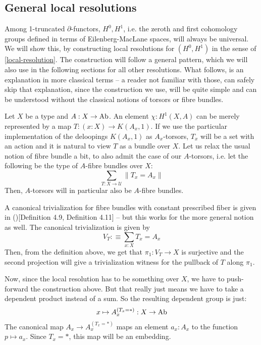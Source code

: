 

\subsection{General local resolutions}


Among 1-truncated $\partial$-functors, $H^0, H^1$, i.e. the zeroth and first cohomology groups defined in terms of Eilenberg-MacLane spaces, will always be universal.
We will show this, by constructing local resolutions for $(H^0,H^1)$ in the sense of \cref{local-resolution}.
The construction will follow a general pattern,
which we will also use in the following sections for all other resolutions.
What follows, is an explanation in more classical terms -- a reader not familiar with those,
can safely skip that explanation, since the construction we use, will be quite simple
and can be understood without the classical notions of torsors or fibre bundles.

Let $X$ be a type and $A:X\to \operatorname{Ab}$.
An element $\chi:H^1(X,A)$ can be merely represented by a map $T:(x:X)\to K(A_x,1)$.
If we use the particular implementation of the deloopings $K(A_x,1)$ as
$A_x$-torsors, $T_x$ will be a set with an action and it is natural to view $T$ as a bundle over $X$.
Let us relax the usual notion of fibre bundle a bit, to also admit the case of our $A$-torsors,
i.e. let the following be the type of $A$-fibre bundles over $X$:
\[ \sum_{T:X\to\mathcal U}\|T_x=A_x\|\]
Then, $A$-torsors will in particular also be $A$-fibre bundles.

A canonical trivialization for fibre bundles with constant prescribed fiber
is given in (\cite{cherubini-cartan})[Definition 4.9, Definition 4.11] -- but this works for the more general notion as well.
The canonical trivialization is given by
\[ V_T:\equiv \sum_{x:X}T_x=A_x \]
Then, from the definition above, we get that $\pi_1:V_T\to X$ is surjective
and the second projection will give a trivialization witness for the pullback of $T$ along $\pi_1$.

Now, since the local resolution has to be something over $X$, we have to push-forward the construction above.
But that really just means we have to take a dependent product instead of a sum.
So the resulting dependent group is just:
\[ x\mapsto A_x^{(T_x=\ast)} : X\to\operatorname{Ab}\]
The canonical map $A_x\to A_x^{(T_x=\ast)}$ maps an element $a_x:A_x$ to the function $p\mapsto a_x$.
Since $T_x=\ast$, this map will be an embedding.

